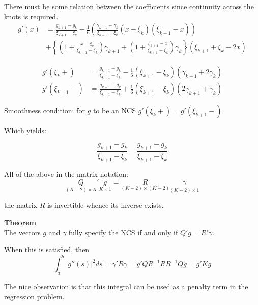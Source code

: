 \documentclass[a4paper]{article}
\newcommand{\obj}[1]{{\left\{ #1 \right \}}}
\newcommand{\brac}[1]{{\left ( #1 \right )}}
\newcommand{\abs}[1]{{\left | #1 \right |}}
\begin{document}
There must be some relation between the coefficients since continuity across the knots is required.
\begin{align*}
g'(x) &= \frac{g_{k+1}-g_k}{\xi_{k+1}-\xi_k}
	-\frac{1}{6} \brac{ \frac{\gamma_{k+1}-\gamma_k}{\xi_{k+1}-\xi_k} (x-\xi_k)(\xi_{k+1}-x) }\\
	&+ \obj{
		\brac{1+\frac{x-\xi_k}{\xi_{k+1}-\xi_k}}\gamma_{k+1}
		+ \brac{1+\frac{\xi_{k+1}-x}{\xi_{k+1}-\xi_k}}\gamma_k
	} \brac{\xi_{k+1} + \xi_k - 2 x}
\end{align*}

\begin{align*}
g'(\xi_k+) &= \frac{g_{k+1}-g_k}{\xi_{k+1}-\xi_k} - \frac{1}{6} \brac{\xi_{k+1}-\xi_k}\brac{\gamma_{k+1}+2\gamma_k}\\
g'(\xi_{k+1}-) &=\frac{g_{k+1}-g_k}{\xi_{k+1}-\xi_k} + \frac{1}{6} \brac{\xi_{k+1}-\xi_k}\brac{2\gamma_{k+1}+\gamma_k}
\end{align*}

Smoothness condition: for $g$ to be an NCS $g'(\xi_k+)=g'(\xi_{k+1}-)$.

Which yields:

\[ \frac{g_{k+1}-g_k}{\xi_{k+1}-\xi_k} - \frac{g_{k+1}-g_k}{\xi_{k+1}-\xi_k}\]


All of the above in the matrix notation:
\[\underset{(K-2)\times K}{Q}'\underset{K\times1}{g} = \underset{(K-2)\times(K-2)}{R}\underset{(K-2)\times1}{\gamma}\]

the matrix $R$ is invertible whence its inverse exists.


\noindent\textbf{Theorem}\hfill \\
The vectors $g$ and $\gamma$ fully specify the NCS if and only if $Q'g = R'\gamma$.

When this is satisfied, then 
\[\int_a^b \abs{g''(s)}^2 ds = \gamma' R \gamma = g' Q R^{-1} R R^{-1} Q g = g' K g\]

The nice observation is that this integral can be used as a penalty term in the regression problem.
\end{document}
